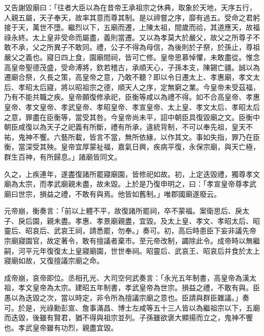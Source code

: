 \begin{pinyinscope}
又告謝毀廟曰：「往者大臣以為在昔帝王承祖宗之休典，取象於天地，天序五行，人親五屬，天子奉天，故率其意而尊其制。是以禘嘗之序，靡有過五。受命之君躬接于天，萬世不墮。繼烈以下，五廟而遷，上陳太祖，間歲而祫，其道應天，故福祿永終。太上皇非受命而屬盡，義則當遷。又以為孝莫大於嚴父，故父之所尊子不敢不承，父之所異子不敢同。禮，公子不得為母信，為後則於子祭，於孫止，尊祖嚴父之義也。寢日四上食，園廟間祠，皆可亡修。皇帝思慕悼懼，未敢盡從。惟念高皇帝聖德茂盛，受命溥將，欽若稽古，承順天心，子孫本支，陳錫亡疆。誠以為遷廟合祭，久長之策，高皇帝之意，乃敢不聽？即以令日遷太上、孝惠廟，孝文太后、孝昭太后寢，將以昭祖宗之德，順天人之序，定無窮之業。今皇帝未受茲福，乃有不能共職之疾。皇帝願復修承祀，臣衡等咸以為禮不得。如不合高皇帝、孝惠皇帝、孝文皇帝、孝武皇帝、孝昭皇帝、孝宣皇帝、太上皇、孝文太后、孝昭太后之意，罪盡在臣衡等，當受其咎。今皇帝尚未平，詔中朝臣具復毀廟之文。臣衡中朝臣咸復以為天子之祀義有所斷，禮有所承，違統背制，不可以奉先祖，皇天不祐，鬼神不饗。六藝所載，皆言不當，無所依緣，以作其文。事如失指，罪乃在臣衡，當深受其殃。皇帝宜厚蒙祉福，嘉氣日興，疾病平復，永保宗廟，與天亡極，群生百神，有所歸息。」諸廟皆同文。

久之，上疾連年，遂盡復諸所罷寢廟園，皆修祀如故。初，上定迭毀禮，獨尊孝文廟為太宗，而孝武廟親未盡，故未毀。上於是乃復申明之，曰：「孝宣皇帝尊孝武廟曰世宗，損益之禮，不敢有與焉。他皆如舊制。」唯郡國廟遂廢云。

元帝崩，衡奏言：「前以上體不平，故復諸所罷祠，卒不蒙福。案衛思后、戾太子、戾后園，親未盡。孝惠、孝景廟親盡，宜毀。及太上皇、孝文、孝昭太后、昭靈后、昭哀后、武哀王祠，請悉罷，勿奉。」奏可。初，高后時患臣下妄非議先帝宗廟寢園官，故定著令，敢有擅議者棄市。至元帝改制，蠲除此令。成帝時以無繼嗣，河平元年復復太上皇寢廟園，世世奉祠。昭靈后、武哀王、昭哀后并食於太上寢廟如故，又復擅議宗廟之命。

成帝崩，哀帝即位。丞相孔光、大司空何武奏言：「永光五年制書，高皇帝為漢太祖，孝文皇帝為太宗。建昭五年制書，孝武皇帝為世宗。損益之禮，不敢有與。臣愚以為迭毀之次，當以時定，非令所為擅議宗廟之意也。臣請與群臣雜議。」奏可。於是，光祿勳彭宣、詹事滿昌、博士左咸等五十三人皆以為繼祖宗以下，五廟而迭毀，後雖有賢君，猶不得與祖宗並列。子孫雖欲褒大顯揚而立之，鬼神不饗也。孝武皇帝雖有功烈，親盡宜毀。


\end{pinyinscope}
